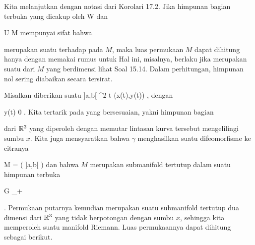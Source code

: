 {}
{

Kita melanjutkan dengan notasi dari
Korolari 17.2.
Jika himpunan bagian terbuka yang dicakup oleh
\mathkor {} {W} {dan} {\varphi} {}

\mavergleichskette
{\vergleichskette
{ U
}
{ \subseteq }{ M
}
{  }{
}
{    }{
}
{   }{
}
}
{}{}{}
mempunyai sifat bahwa

 merupakan suatu
terhadap
pada $M$, maka luas permukaan $M$ dapat dihitung hanya dengan memakai rumus untuk
 Hal ini, misalnya, berlaku jika
 merupakan suatu
dari $M$ yang berdimensi
 lihat
Soal 15.14.
Dalam perhitungan, himpunan nol sering diabaikan secara tersirat.

}


Misalkan diberikan suatu
\maabbeledisp {\gamma} {]a,b[} {\R^2
} {t} {(x(t),y(t))
} {,}
dengan

\mavergleichskette
{\vergleichskette
{ y(t)
}
{ \geq }{ 0
}
{  }{
}
{    }{
}
{   }{
}
}
{}{}{.}
Kita tertarik pada
yang bersesuaian, yakni himpunan bagian

\mathdisp {\left\{  (x(t), y(t) \cos \alpha , y(t) \sin \alpha)   \mid   t \in ]a,b[  , \,  \alpha \in [0,2\pi]       \right\}} {  }

dari ${\mathbb R}^3$ yang diperoleh dengan memutar lintasan kurva tersebut mengelilingi sumbu $x$. Kita juga mensyaratkan bahwa $\gamma$ menghasilkan suatu difeomorfisme ke citranya

\mavergleichskette
{\vergleichskette
{ M
}
{ = }{ \gamma \left(  ]a,b[  \right)
}
{  }{
}
{    }{
}
{   }{
}
}
{}{}{}
dan bahwa $M$ merupakan submanifold tertutup dalam suatu himpunan terbuka

\mavergleichskettedisp
{\vergleichskette
{ G
}
{ \subseteq} {\R \times \R_+
}
{ } {
}
{ } {
}
{ } {
}
}
{}{}{}

 {} {.}
Permukaan putarnya kemudian merupakan suatu submanifold tertutup dua dimensi dari ${\mathbb R}^3$ yang tidak berpotongan dengan sumbu $x$, sehingga kita memperoleh suatu manifold Riemann. Luas permukaannya dapat dihitung sebagai berikut.



